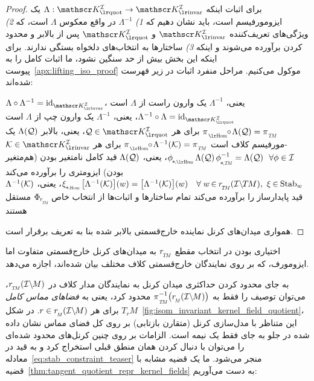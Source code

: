 \begin{proof}
    برای اثبات اینکه $\Lambda: \KIquot \to \KIfull$ یک ایزومورفیسم است، باید نشان دهیم که
    \textit{1)} $\Lambda^{-1}$ در واقع معکوس $\Lambda$ است، که
    \textit{2)} ویژگی‌های تعریف‌کننده $\KIfull$ و $\KIquot$ پس از بالابر و محدود کردن برآورده می‌شوند و اینکه
    \textit{3)} ساختارها به انتخاب‌های دلخواه بستگی ندارند.
    برای اینکه این بخش بیش از حد سنگین نشود، ما اثبات کامل را به پیوست~\ref{apx:lifting_iso_proof} موکول می‌کنیم.
    مراحل منفرد اثبات در زیر فهرست شده‌اند:
\begin{itemize}[leftmargin=1.25cm]
	 $\Lambda \circ \Lambda^{-1} = \id_{\KIfull}$،
	یعنی، $\Lambda^{-1}$ یک وارون راست از $\Lambda$ است
	 $\Lambda^{-1} \circ \Lambda = \id_{\KIquot}$،
	یعنی، $\Lambda^{-1}$ یک وارون چپ از $\Lambda$ است
	 $\piHom \mkern-5mu\circ\mkern-2mu \Lambda(\Q) = \piTM$ برای هر $\Q \in \KIquot$،
	یعنی، بالابر $\Lambda(\mathcal{Q})$ یک -مورفیسم کلاف است
	 ${\piHom \mkern-5mu\circ\mkern-2mu \Lambda^{-1}(\K) = \piTM}$ برای هر $\K \in \KIfull$
	 $\dphiHom \Lambda(\Q)\, \dphiTMinv = \Lambda(\Q)\ \ \forall \phi \in \I$،
	یعنی، $\Lambda(\mathcal{Q})$ قید کامل نامتغیر بودن (هم‌متغیر بودن) ایزومتری را برآورده می‌کند
	 $\dxiHom \big[\Lambda^{-1}(\K)\big](w) = \big[\Lambda^{-1}(\K)\big](w) \ \ \
	\forall\; w \mkern-2mu\in\mkern-1mu \rTM(\ITM),\ \xi \mkern-1mu\in\mkern-1mu \Stab{w}$، 
	یعنی، $\Lambda^{-1}(\mathcal{K})$ قید پایدارساز را برآورده می‌کند
	 تمام ساختارها و اثبات‌ها از انتخاب خاص $\PhirNoArg$ مستقل هستند
\end{itemize}
    همواری میدان‌های کرنل نماینده خارج‌قسمتی بالابر شده بنا به تعریف برقرار است.
\end{proof}
اختیاری بودن در انتخاب مقطع $\rTM$ به میدان‌های کرنل خارج‌قسمتی متفاوت اما ایزومورف، که بر روی نمایندگان خارج‌قسمتی کلاف مختلف بیان شده‌اند، اجازه می‌دهد.


به جای محدود کردن حداکثری میدان کرنل به نمایندگان مدار کلاف در $\rTM(\IM)$، می‌توان توصیف را فقط به $\piTM^{-1}\big( \rM(\IM) \big)$ محدود کرد، یعنی به \emph{فضاهای مماس کامل} $T_rM$ برای هر $r\in \rM(\IM)$.
در شکل~\eqref{fig:isom_invariant_kernel_field_quotient}، این متناظر با مدل‌سازی کرنل (متقارن بازتابی) بر روی کل فضای مماس نشان داده شده در جلو به جای فقط یک نیمه است.
الزامات بر روی چنین کرنل‌های محدود شده‌ای را می‌توان با دنبال کردن همان منطق قبلی استخراج کرد و به قید در معادله~\eqref{eq:stab_constraint_teaser} منجر می‌شود.
ما یک قضیه مشابه با قضیه~\eqref{thm:tangent_quotient_repr_kernel_fields} به دست می‌آوریم:


